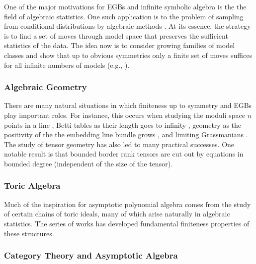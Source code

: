 One of the major motivations for EGBs and infinite symbolic algebra is the the field of algebraic statistics.  One such application is to the problem of sampling from conditional distributions by algebraic methods \cite{diaconis1998algebraic}.  At its essence, the strategy is to find a set of moves through model space that preserves the sufficient statistics of the data.   The idea now is to consider growing families of model classes and show that up to obvious symmetries only a finite set of moves suffices for all infinite numbers of models (e.g., \cite{aoki2003minimal, santos2003higher, hocsten2007finiteness, drton2007algebraic, Draisma08b, Brouwer09e, draisma2009ideals, hillar2012finite, draisma2015finiteness}).

\subsubsection{Algebraic Geometry}

There are many natural situations in which finiteness up to symmetry and EGBs play important roles.  For instance, this occurs when studying the moduli space $n$ points in a line \cite{howard2009equations}, Betti tables as their length goes to infinity \cite{ein2015asymptotics}, geometry as the positivity of the the embedding line bundle grows \cite{ein2012asymptotic}, and limiting Grassmanians \cite{draisma2015plucker}.  The study of tensor geometry has also led to many practical successes.  One notable result is that bounded border rank tensors are cut out by equations in bounded degree \cite{draisma2014bounded} (independent of the size of the tensor).

%

\subsubsection{Toric Algebra}

Much of the inspiration for asymptotic polynomial algebra comes from the study of certain chains of toric ideals, many of which arise naturally in algebraic statistics.  The series of works \cite{Hillar13, hillar2016corrigendum, draisma2013noetherianity, KKL:equivariant-markov} has developed fundamental finiteness properties of these structures.


\subsubsection{Category Theory and Asymptotic Algebra}

